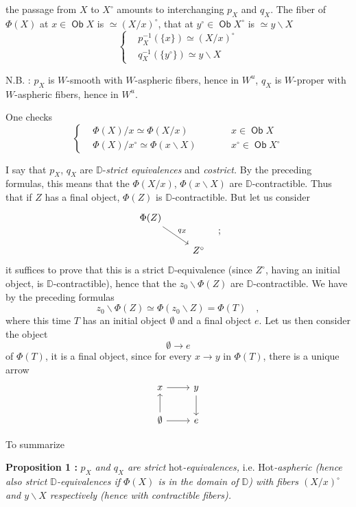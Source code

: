 \documentclass[11pt]{article}
\newcommand{\printedpage}[1]{\marginpar{\footnotesize p.~#1}}
\newcommand{\msp}[1]{\marginpar{\footnotesize [#1]}}
\newcommand{\D}{\mathbb{D}}
\newcommand{\Ob}{\mathop{\mathsf{Ob}}}
\newcommand{\bs}{\backslash}
\begin{document}
\printedpage{44}
the passage from $X$ to $X^\circ$ amounts to interchanging $p_X$ and $q_X$. The fiber of $\Phi(X)$ at $x \in \Ob X$ is $\simeq (X/x)^\circ$, that at $y^\circ \in \Ob X^\circ$ is $\simeq y\bs X$
\[
\left\{
\begin{aligned}
&p_X^{-1}(\{x\}) \simeq (X/x)^\circ\\
&q_X^{-1}(\{y^\circ\}) \simeq y\bs X
\end{aligned}
\right.
\]

N.B. : $p_X$ is $W$-smooth with $W$-aspheric fibers, hence in $W^u$, $q_X$ is $W$-proper with $W$-aspheric fibers, hence in $W^u$.

\msp{page 74}

One checks
\[
\left\{
\begin{aligned}
&\Phi(X)/x \simeq \Phi(X/x) &\qquad& x \in \Ob X\\
&\Phi(X)/x^\circ \simeq \Phi(x\bs X) &\qquad& x^\circ \in \Ob X^\circ
\end{aligned}
\right.
\]

I say that $p_X$, $q_X$ are $\D$-\textit{strict equivalences} and \textit{costrict.} By the preceding formulas, this means that the $\Phi(X/x)$, $\Phi(x\bs X)$ are $\D$-contractible. Thus that if $Z$ has a final object, $\Phi(Z)$ is $\D$-contractible. But let us consider
\[
\begin{tikzcd}
\Phi(Z) \arrow[dr, "q_Z"] & \\
& Z^\circ
\end{tikzcd}
\quad ;
\]
it suffices to prove that this is a strict $\D$-equivalence (since $Z^\circ$, having an initial object, is $\D$-contractible), hence that the $z_0\bs\Phi(Z)$ are $\D$-contractible. We have by the preceding formulas %
\[
z_0\bs\Phi(Z) \simeq \Phi(z_0\bs Z) = \Phi(T) \quad ,
\]
where this time $T$ has an initial object $\emptyset$ and a final object $e$. Let us then consider the object
\[
\emptyset \longrightarrow e
\]
of $\Phi(T)$, it is a final object, since for every $x \to y$ in $\Phi(T)$, there is a unique arrow
\[
\begin{tikzcd}
x \arrow[r] & y \arrow[d] \\
\emptyset \arrow[u] \arrow[r] & e
\end{tikzcd}
\]

\printedpage{45}
\msp{page 75}

To summarize

\textbf{Proposition 1 :} \textit{$p_X$ and $q_X$ are strict} \textsf{hot}\textit{-equivalences,} i.e. \textsf{Hot}\textit{-aspheric (hence also strict $\D$-equivalences if $\Phi(X)$ is in the domain of $\D$) with fibers $(X/x)^\circ$ and $y\bs X$ respectively (hence with contractible fibers).}
\end{document}
